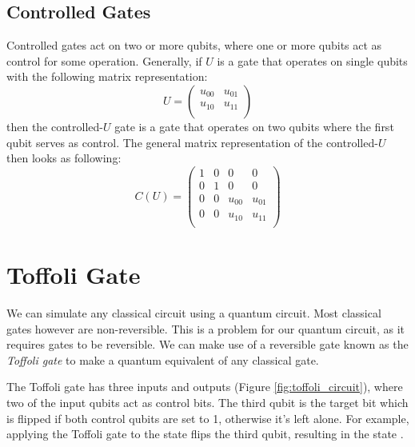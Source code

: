 \documentclass[11pt, notitlepage]{report}
\begin{document}
\subsection{Controlled Gates}
Controlled gates act on two or more qubits, where one or more qubits act as control for some operation. Generally, if $U$ is a gate that operates on single qubits with the following matrix representation:
\[
  U =
  \begin{pmatrix}
  u_{00} & u_{01} \\
  u_{10} & u_{11} \\
  \end{pmatrix}
\]
then the controlled-$U$ gate is a gate that operates on two qubits where the first qubit serves as control. The general matrix representation of the controlled-$U$ then looks as following:
\[
  C(U) =
  \begin{pmatrix}
  1 & 0 & 0 & 0 \\
  0 & 1 & 0 & 0 \\
  0 & 0 & u_{00} & u_{01} \\
  0 & 0 & u_{10} & u_{11} \\
  \end{pmatrix}
\]
\section{Toffoli Gate}
We can simulate any classical circuit using a quantum circuit. Most classical gates however are non-reversible. This is a problem for our quantum circuit, as it requires gates to be reversible. We can make use of a reversible gate known as the \emph{Toffoli gate} to make a quantum equivalent of any classical gate.

The Toffoli gate has three inputs and outputs (Figure \ref{fig:toffoli_circuit}), where two of the input qubits act as control bits. The third qubit is the target bit which is flipped if both control qubits are set to 1, otherwise it's left alone. For example, applying the Toffoli gate to the state  flips the third qubit, resulting in the state .
\end{document}
